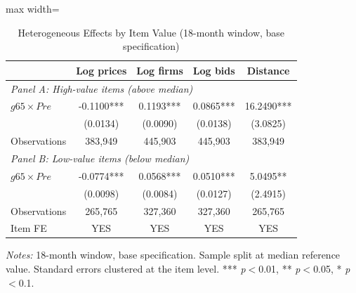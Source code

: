 \begin{table}[htbp]
\centering
\caption{Heterogeneous Effects by Item Value (18-month window, base specification)}
\label{tab:heterog_value}
\begin{adjustbox}{max width=\textwidth}
\begin{threeparttable}
\small
\begin{tabular}{lcccc}
\toprule
 & Log prices & Log firms & Log bids & Distance \\
\midrule
\multicolumn{5}{l}{\textit{Panel A: High-value items (above median)}} \\
$g65 \times Pre$ & -0.1100*** & 0.1193*** & 0.0865*** & 16.2490*** \\
 & (0.0134) & (0.0090) & (0.0138) & (3.0825) \\
Observations & 383,949 & 445,903 & 445,903 & 383,949 \\
\midrule
\multicolumn{5}{l}{\textit{Panel B: Low-value items (below median)}} \\
$g65 \times Pre$ & -0.0774*** & 0.0568*** & 0.0510*** & 5.0495** \\
 & (0.0098) & (0.0084) & (0.0127) & (2.4915) \\
Observations & 265,765 & 327,360 & 327,360 & 265,765 \\
\midrule
Item FE & YES & YES & YES & YES \\
\bottomrule
\end{tabular}
\begin{tablenotes}
\small
\item \textit{Notes:} 18-month window, base specification. Sample split at median reference value.
Standard errors clustered at the item level.
*** \textit{p}$<$0.01, ** \textit{p}$<$0.05, * \textit{p}$<$0.1.
\end{tablenotes}
\end{threeparttable}
\end{adjustbox}
\end{table}
